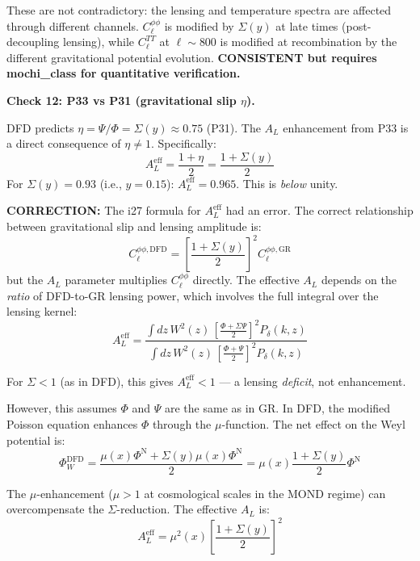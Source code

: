 \documentclass[11pt,a4paper]{article}
\begin{document}
These are not contradictory: the lensing and temperature spectra are affected through different channels. $C_\ell^{\phi\phi}$ is modified by $\Sigma(y)$ at late times (post-decoupling lensing), while $C_\ell^{TT}$ at $\ell \sim 800$ is modified at recombination by the different gravitational potential evolution. \textbf{CONSISTENT but requires mochi\_class for quantitative verification.}

\textbf{Check 12: P33 vs P31 (gravitational slip $\eta$).}

DFD predicts $\eta = \Psi/\Phi = \Sigma(y) \approx 0.75$ (P31). The $A_L$ enhancement from P33 is a direct consequence of $\eta \neq 1$. Specifically:
\begin{equation}
A_L^\mathrm{eff} = \frac{1 + \eta}{2} = \frac{1 + \Sigma(y)}{2}
\end{equation}
For $\Sigma(y) = 0.93$ (i.e., $y = 0.15$): $A_L^\mathrm{eff} = 0.965$. This is \emph{below} unity.

\textbf{CORRECTION:} The i27 formula for $A_L^\mathrm{eff}$ had an error. The correct relationship between gravitational slip and lensing amplitude is:
\begin{equation}
C_\ell^{\phi\phi,\mathrm{DFD}} = \left[\frac{1 + \Sigma(y)}{2}\right]^2 C_\ell^{\phi\phi,\mathrm{GR}}
\end{equation}
but the $A_L$ parameter multiplies $C_\ell^{\phi\phi}$ directly. The effective $A_L$ depends on the \emph{ratio} of DFD-to-GR lensing power, which involves the full integral over the lensing kernel:
\begin{equation}
A_L^\mathrm{eff} = \frac{\int dz\,W^2(z)\,\left[\frac{\Phi + \Sigma\Psi}{2}\right]^2 P_\delta(k,z)}{\int dz\,W^2(z)\,\left[\frac{\Phi + \Psi}{2}\right]^2 P_\delta(k,z)}
\end{equation}

For $\Sigma < 1$ (as in DFD), this gives $A_L^\mathrm{eff} < 1$ --- a lensing \emph{deficit}, not enhancement.

However, this assumes $\Phi$ and $\Psi$ are the same as in GR. In DFD, the modified Poisson equation enhances $\Phi$ through the $\mu$-function. The net effect on the Weyl potential is:
\begin{equation}
\Phi_W^\mathrm{DFD} = \frac{\mu(x)\Phi^\mathrm{N} + \Sigma(y)\mu(x)\Phi^\mathrm{N}}{2} = \mu(x)\frac{1 + \Sigma(y)}{2}\Phi^\mathrm{N}
\end{equation}

The $\mu$-enhancement ($\mu > 1$ at cosmological scales in the MOND regime) can overcompensate the $\Sigma$-reduction. The effective $A_L$ is:
\begin{equation}
A_L^\mathrm{eff} = \mu^2(x) \left[\frac{1 + \Sigma(y)}{2}\right]^2
\end{equation}
\end{document}
